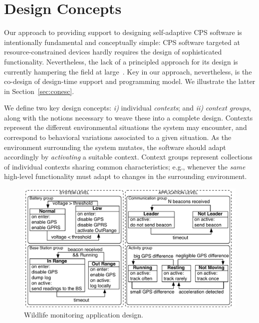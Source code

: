 \section{Design Concepts}
\label{sec:design}

Our approach to providing support to designing self-adaptive CPS
software is intentionally fundamental and conceptually simple: CPS
software targeted at resource-constrained devices hardly requires the
design of sophisticated functionality. Nevertheless, the lack of a
principled approach for its design is currently hampering the field at
large~\cite{gp,cpskeynote}. Key in our approach, nevertheless, is the
co-design of design-time support and programming model. We illustrate
the latter in Section~\ref{sec:conesc}.

We define two key design concepts: \emph{i)} individual
\emph{contexts}; and \emph{ii)} \emph{context groups}, along with the
notions necessary to weave these into a complete design.  Contexts
represent the different environmental situations the system may
encounter, and correspond to behavioral variations associated to a
given situation. As the environment surrounding the system mutates,
the software should adapt accordingly by \emph{activating} a suitable
context. Context groups represent collections of individual contexts
sharing common characteristics; e.g., whenever the \emph{same}
high-level functionality must adapt to changes in the surrounding
environment.

\begin{figure}
\begin{center}
\includegraphics[scale=.45]{imgs/wildlifetracking}
\vspace{-2mm}
\caption{Wildlife monitoring application design.}
  \label{fig:design}
\vspace{-4mm}
\end{center}
\end{figure}

